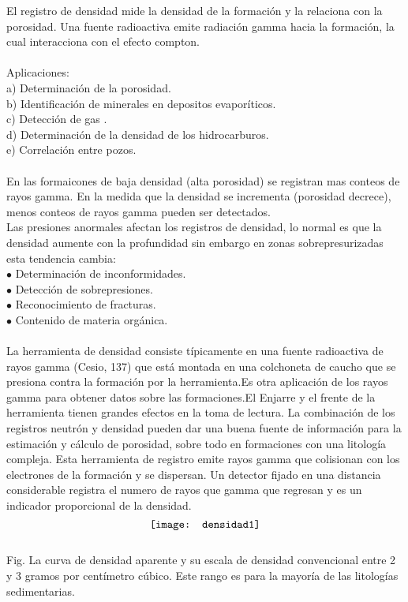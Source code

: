 \documentclass[10pt,a4paper]{report}
\begin{document}
\newpage 
El registro de densidad mide la densidad de la formación y la relaciona con la porosidad. Una fuente radioactiva emite radiación gamma hacia la formación, la cual interacciona con el efecto compton.
\\\\Aplicaciones: 
\\ a) Determinación de la porosidad.
\\ b) Identificación de minerales en depositos evaporíticos.
\\ c) Detección de gas .
\\ d) Determinación de la densidad de los hidrocarburos.
\\ e) Correlación entre pozos.
\\\\ En las formaicones de baja densidad (alta porosidad) se registran mas conteos de rayos gamma. En la medida que la densidad se incrementa (porosidad decrece), menos conteos de rayos gamma pueden ser detectados.
\\ Las presiones anormales afectan los registros de densidad, lo normal es que la densidad aumente con la profundidad sin embargo en zonas sobrepresurizadas esta tendencia cambia:
\\ $\bullet$ Determinación de inconformidades.
\\ $\bullet$ Detección de sobrepresiones.
\\ $\bullet$ Reconocimiento de fracturas.
\\ $\bullet$ Contenido de materia orgánica.
\\\\ La herramienta de densidad consiste típicamente en una fuente radioactiva de rayos gamma (Cesio, 137) que está montada en una colchoneta de caucho que se presiona contra la formación por la herramienta.Es otra aplicación de los rayos gamma para obtener datos sobre las formaciones.El Enjarre y el frente de la herramienta tienen grandes efectos en la toma de lectura. La combinación de los registros neutrón y densidad pueden dar una buena fuente de información para la estimación y cálculo de porosidad, sobre todo en formaciones con una litología compleja. Esta herramienta de registro emite rayos gamma que colisionan con los electrones de la formación y se dispersan. Un detector fijado en una distancia considerable registra el numero de rayos que gamma que regresan y es un indicador proporcional de la densidad.
\\ $$\\  \texttt{[image: densidad1]}$$
\\ Fig. La curva de densidad aparente y su escala de densidad convencional entre 2 y 3 gramos por centímetro cúbico. Este rango es para la mayoría de las litologías sedimentarias.
\end{document}
